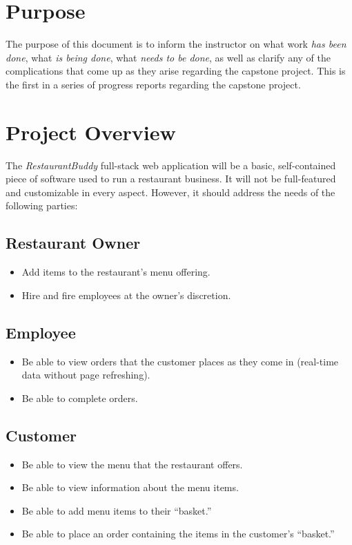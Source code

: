 \documentclass[letterpaper,11pt]{../../templates/texMemo}
\begin{document}
    \maketitle


    \section{Purpose}
    The purpose of this document is to inform the instructor on what work \textit{has been done}, what \textit{is being done}, what \textit{needs to be done}, as well as clarify any of the complications that come up as they arise regarding the capstone project. This is the first in a series of progress reports regarding the capstone project.


    \section{Project Overview}
    The \textit{RestaurantBuddy} full-stack web application will be a basic, self-contained piece of software used to run a restaurant business. It will not be full-featured and customizable in every aspect. However, it should address the needs of the following parties:

    \subsection{Restaurant Owner}
    \begin{itemize}
        \item Add items to the restaurant's menu offering.
        \item Hire and fire employees at the owner's discretion.
    \end{itemize}

    \subsection{Employee}
    \begin{itemize}
        \item Be able to view orders that the customer places as they come in (real-time data without page refreshing).
        \item Be able to complete orders.
    \end{itemize}

    \subsection{Customer}
    \begin{itemize}
        \item Be able to view the menu that the restaurant offers.
        \item Be able to view information about the menu items.
        \item Be able to add menu items to their ``basket.''
        \item Be able to place an order containing the items in the customer's ``basket.''
    \end{itemize}
\end{document}
